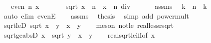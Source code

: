 \begin{isabellebody}
\ \ \ {\isachardoublequoteopen}even\ n{\isachardoublequoteclose}\ {\isachardoublequoteopen}x\ {\isasymge}\ {}{\isachardoublequoteclose}\isanewline
\ \ \ \ \ {\isachardoublequoteopen}sqrt\ x\ {\isacharcircum}{\kern0pt}\ n\ {\isacharequal}{\kern0pt}\ x\ {\isacharcircum}{\kern0pt}\ {\isacharparenleft}{\kern0pt}n\ div\ {}{\isacharparenright}{\kern0pt}{\isachardoublequoteclose}\isanewline
%
\isadelimproof
%
\endisadelimproof
%
\isatagproof
{}\isamarkupfalse%
\ {\isacharminus}{\kern0pt}\isanewline
\ \ \isamarkupfalse%
\ assms\ \isamarkupfalse%
\ k\ \ {\isachardoublequoteopen}n\ {\isacharequal}{\kern0pt}\ {}{\isacharasterisk}{\kern0pt}k{\isachardoublequoteclose}\ \isamarkupfalse%
\ {\isacharparenleft}{\kern0pt}auto\ elim{\isacharbang}{\kern0pt}{\isacharcolon}{\kern0pt}\ evenE{\isacharparenright}{\kern0pt}\isanewline
\ \ \isamarkupfalse%
\ assms\ \isamarkupfalse%
\ {\isacharquery}{\kern0pt}thesis\ \isamarkupfalse%
\ {\isacharparenleft}{\kern0pt}simp\ add{\isacharcolon}{\kern0pt}\ power{\isacharunderscore}{\kern0pt}mult{\isacharparenright}{\kern0pt}\isanewline
{}\isamarkupfalse%
%
\endisatagproof
{\isafoldproof}%
%
\isadelimproof
\isanewline
%
\endisadelimproof
\isanewline
{}\isamarkupfalse%
\ sqrt{\isacharunderscore}{\kern0pt}le{\isacharunderscore}{\kern0pt}D{\isacharcolon}{\kern0pt}\ {\isachardoublequoteopen}sqrt\ x\ {\isasymle}\ y\ {\isasymLongrightarrow}\ x\ {\isasymle}\ y\isanewline
%
\isadelimproof
\ \ %
\endisadelimproof
%
\isatagproof
{}\isamarkupfalse%
\ {\isacharparenleft}{\kern0pt}meson\ not{\isacharunderscore}{\kern0pt}le\ real{\isacharunderscore}{\kern0pt}less{\isacharunderscore}{\kern0pt}rsqrt{\isacharparenright}{\kern0pt}%
\endisatagproof
{\isafoldproof}%
%
\isadelimproof
\isanewline
%
\endisadelimproof
\isanewline
{}\isamarkupfalse%
\ sqrt{\isacharunderscore}{\kern0pt}ge{\isacharunderscore}{\kern0pt}absD{\isacharcolon}{\kern0pt}\ {\isachardoublequoteopen}{\isasymbar}x{\isasymbar}\ {\isasymle}\ sqrt\ y\ {\isasymLongrightarrow}\ x\ {\isasymle}\ y{\isachardoublequoteclose}\isanewline
%
\isadelimproof
\ \ %
\endisadelimproof
%
\isatagproof
{}\isamarkupfalse%
\ real{\isacharunderscore}{\kern0pt}sqrt{\isacharunderscore}{\kern0pt}le{\isacharunderscore}{\kern0pt}iff{\isacharbrackleft}{\kern0pt}of\ {\isachardoublequoteopen}x\ \isamarkupfalse%

\end{isabellebody}
